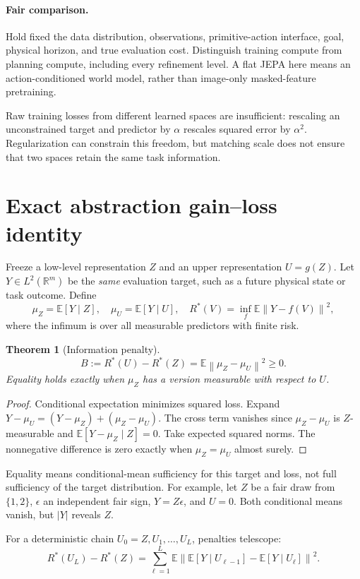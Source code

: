 \documentclass[11pt]{article}
\newtheorem{theorem}{Theorem}
\newcommand{\E}{\mathbb{E}}
\newcommand{\R}{\mathbb{R}}
\newcommand{\norm}[1]{\left\lVert #1\right\rVert}
\begin{document}
\paragraph{Fair comparison.}
Hold fixed the data distribution, observations, primitive-action interface, goal, physical horizon, and true evaluation cost. Distinguish training compute from planning compute, including every refinement level. A flat JEPA here means an action-conditioned world model, rather than image-only masked-feature pretraining.

Raw training losses from different learned spaces are insufficient: rescaling an unconstrained target and predictor by $\alpha$ rescales squared error by $\alpha^2$. Regularization can constrain this freedom, but matching scale does not ensure that two spaces retain the same task information.

\section{Exact abstraction gain--loss identity}
Freeze a low-level representation $Z$ and an upper representation $U=g(Z)$. Let $Y\in L^2(\R^m)$ be the \emph{same} evaluation target, such as a future physical state or task outcome. Define
\[
 \mu_Z=\E[Y\mid Z],\quad \mu_U=\E[Y\mid U],\quad
 R^*(V)=\inf_f\E\norm{Y-f(V)}^2 ,
\]
where the infimum is over all measurable predictors with finite risk.

\begin{theorem}[Information penalty]
\label{thm:information}
\[
 B:=R^*(U)-R^*(Z)=\E\norm{\mu_Z-\mu_U}^2\geq0 .
\]
Equality holds exactly when $\mu_Z$ has a version measurable with respect to $U$.
\end{theorem}
\begin{proof}
Conditional expectation minimizes squared loss. Expand
$Y-\mu_U=(Y-\mu_Z)+(\mu_Z-\mu_U)$.
The cross term vanishes since $\mu_Z-\mu_U$ is $Z$-measurable and
$\E[Y-\mu_Z\mid Z]=0$. Take expected squared norms. The nonnegative difference is zero exactly when $\mu_Z=\mu_U$ almost surely.
\end{proof}

Equality means conditional-mean sufficiency for this target and loss, not full sufficiency of the target distribution. For example, let $Z$ be a fair draw from $\{1,2\}$, $\epsilon$ an independent fair sign, $Y=Z\epsilon$, and $U=0$. Both conditional means vanish, but $|Y|$ reveals $Z$.

For a deterministic chain $U_0=Z,U_1,\ldots,U_L$, penalties telescope:
\[
 R^*(U_L)-R^*(Z)=
 \sum_{\ell=1}^{L}\E\norm{\E[Y\mid U_{\ell-1}]-\E[Y\mid U_\ell]}^2.
\]
\end{document}
